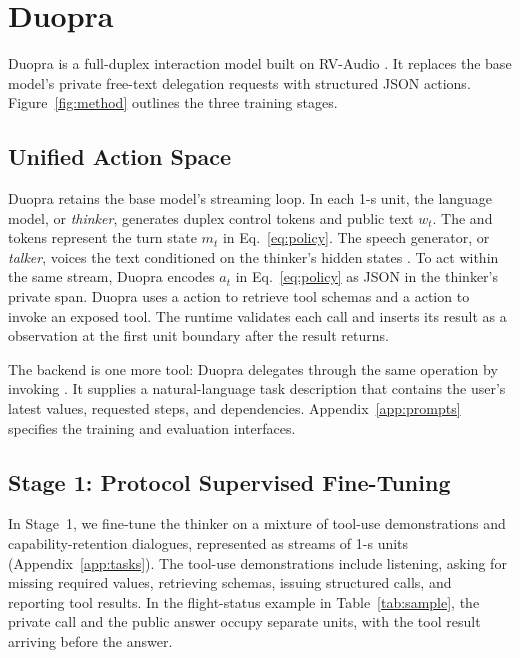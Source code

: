\section{Duopra}
\label{sec:method}



Duopra is a full-duplex interaction model built on RV-Audio \citep{venus2026realtimevenus}. It replaces the base model's private free-text delegation requests with structured JSON actions. Figure~\ref{fig:method} outlines the three training stages.

\subsection{Unified Action Space}
\label{sec:model}\label{sec:action}

Duopra retains the base model's streaming loop. In each 1-s unit, the language model, or \emph{thinker}, generates duplex control tokens and public text $w_t$. The  and  tokens represent the turn state $m_t$ in Eq.~\eqref{eq:policy}. The speech generator, or \emph{talker}, voices the text conditioned on the thinker's hidden states \citep{xu2025qwen25omni}. To act within the same stream, Duopra encodes $a_t$ in Eq.~\eqref{eq:policy} as JSON in the thinker's private  span. Duopra uses a  action to retrieve tool schemas and a  action to invoke an exposed tool. The runtime validates each call and inserts its result as a  observation at the first unit boundary after the result returns.

The backend is one more tool: Duopra delegates through the same  operation by invoking . It supplies a natural-language task description that contains the user's latest values, requested steps, and dependencies. Appendix~\ref{app:prompts} specifies the training and evaluation interfaces.


\subsection{Stage 1: Protocol Supervised Fine-Tuning}
\label{sec:training}\label{sec:sft}

In Stage~1, we fine-tune the thinker on a mixture of tool-use demonstrations and capability-retention dialogues, represented as streams of 1-s units (Appendix~\ref{app:tasks}). The tool-use demonstrations include listening, asking for missing required values, retrieving schemas, issuing structured calls, and reporting tool results. In the flight-status example in Table~\ref{tab:sample}, the private call and the public answer occupy separate units, with the tool result arriving before the answer.

